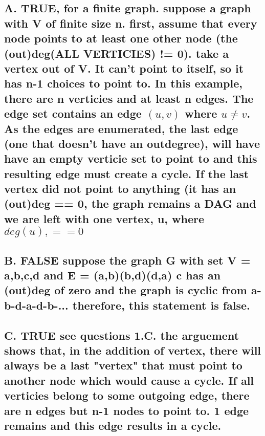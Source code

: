 \documentclass{article}
\begin{document}
\subsection{
A. TRUE, for a finite graph.\newline
suppose a graph with V of finite size n. first, assume that every node points to at least one other node (the (out)deg(ALL VERTICIES) != 0). take a vertex out of V. It can't point to itself, so it has n-1 choices to point to. In this example, there are n verticies and at least n edges. The edge set contains an edge $(u,v)$ where $u\neq v$. As the edges are enumerated, the last edge (one that doesn't have an outdegree), will have have an empty verticie set to point to and this resulting edge must create a cycle. If the last vertex did not point to anything (it has an (out)deg == 0, the graph remains a DAG and we are left with one vertex, u, where $deg(u), == 0 $
}

\subsection{
B. FALSE\newline
suppose the graph G with set V = {a,b,c,d} and E = {(a,b)(b,d)(d,a)}\newline
c has an (out)deg of zero and the graph is cyclic from a-b-d-a-d-b-...\newline
therefore, this statement is false.
}
\subsection{
C. TRUE\newline
see questions 1.C. the arguement shows that, in the addition of vertex, there will always be a last "vertex" that must point to another node which would cause a cycle. If all verticies belong to some outgoing edge, there are n edges but n-1 nodes to point to. 1 edge remains and this edge results in a cycle.
}
\end{document}
